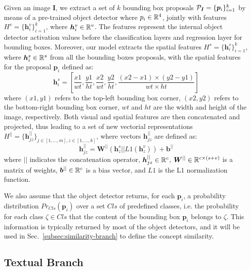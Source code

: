 Given an image $\bm{I}$, we extract a set of $k$ bounding box
proposals $\mathcal{P}_{\bm{I}} = \{ \bm{p}_i \}^k_{i=1}$ by means of a
pre-trained object detector where $p_i \in \mathbb{R}^4$, jointly with
features $H^v = \{ \bm{h}^v_i \}^k_{i=1}$, where $\bm{h}^v_i \in
\mathbb{R}^v$. The features represent the internal object detector
activation values before the classification layers and regression
layer for bounding boxes. Moreover, our model extracts the spatial
features $H^s = \{ \bm{h}^s_i \}^k_{i=1}$, where $\bm{h}^s_i \in
\mathbb{R}^s$ from all the bounding boxes proposals, with the spatial
features for the proposal $\bm{p}_i$ defined as:
\begin{equation}
  \bm{h}^s_i = \left[ \frac{x1}{wt}, \frac{y1}{ht}, \frac{x2}{wt}, \frac{y2}{ht}, \frac{(x2 - x1) \times (y2 - y1)}{wt \times ht}  \right]
\end{equation}
where $(x1, y1)$ refers to the top-left bounding box corner, $(x2,
y2)$ refers to the bottom-right bounding box corner, $wt$ and $ht$ are
the width and height of the image, respectively. Both visual and
spatial features are then concatenated and projected, thus leading to
a set of new vectorial representations $H^{||} = \{ \bm{h}^{||}_{jz}
\}_{j \in [1, \ldots, m], z \in [1, \ldots, k]}$, where vectors
$\bm{h}^{||}_{jz}$ are defined as:
\begin{equation}
  \bm{h}^{||}_{jz} = \bm{W}^{||} \left( \bm{h}^s_z || L1(\bm{h}^v_z) \right) + \bm{b}^{||}
  \label{eq:h-par-jz}
\end{equation}
where $||$ indicates the concatenation operator, $\bm{h}^{||}_{jz} \in
\mathbb{R}^c$, $\bm{W}^{||} \in \mathbb{R}^{c \times (s + v)}$ is a matrix of
weights, $\bm{b}^{||} \in \mathbb{R}^c$ is a bias vector, and $L1$ is the
L$1$ normalization function.

We also assume that the object detector returns, for each $\bm{p}_i$,
a probability distribution $Pr_{Cls}(\bm{p}_i)$ over a set $Cls$ of
predefined classes, i.e. the probability for each class $\zeta \in
Cls$ that the content of the bounding box $\bm{p}_i$ belongs to
$\zeta$. This information is typically returned by most of the object
detectors, and it will be used in Sec.~\ref{subsec:similarity-branch} to define the concept similarity.

\subsection{Textual Branch}
\label{subsec:textual-branch}

